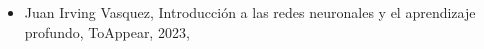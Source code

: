 \begin{itemize} 
\item Juan Irving Vasquez, Introducción a las redes neuronales y el aprendizaje profundo, ToAppear, 2023, \href{https://github.com/irvingvasquez/libro_redes_neuronales} {\faExternalLink} 
\end{itemize} 
